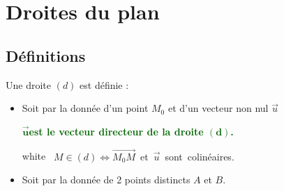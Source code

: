 \section{Droites du plan}
\subsection{Définitions}

Une droite $(d)$ est définie :

\begin{itemize}
    \item Soit par la donnée d'un point $M_{0}$ et d'un vecteur non nul         
          $\vec{u}$ \\ 

           \vspace{.5cm}
 \begin{center}
       
   
 
\end{center} 

\centerline{\textcolor{darkgreen}
           {\bf $\mathbf{\overrightarrow{u}}$est le vecteur directeur de
            la droite $\mathbf{(d)}$.}
            } 

\vspace{.5cm}

\begin{center}
       {white}{
      \hbox{
        $M\in(d)\Longleftrightarrow\overrightarrow{M_{0}M}$ 
            et     $\overrightarrow{u}$ sont colinéaires.}}
\end{center}

\vspace{.5cm}

\item Soit par la donnée de 2 points distincts $A$ et $B$.


\end{itemize}
